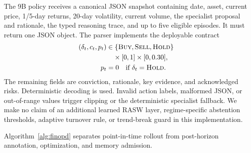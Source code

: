 The 9B policy receives a canonical JSON snapshot containing date, asset, current price, 1/5-day returns, 20-day volatility, current volume, the specialist proposal and rationale, the typed reasoning trace, and up to five eligible episodes. It must return one JSON object. The parser implements the deployable contract
\begin{equation}
\label{eq:selective_execution}
\begin{aligned}
(\delta_t,c_t,p_t)&\in
\{\textsc{Buy},\textsc{Sell},\textsc{Hold}\}\\
&\quad\times[0,1]\times[0,0.30],\\
p_t&=0\quad\text{if }\delta_t=\textsc{Hold}.
\end{aligned}
\end{equation}
The remaining fields are conviction, rationale, key evidence, and acknowledged risks. Deterministic decoding is used. Invalid action labels, malformed JSON, or out-of-range values trigger clipping or the deterministic specialist fallback. We make no claim of an additional learned RASW layer, regime-specific abstention thresholds, adaptive turnover rule, or trend-break guard in this implementation.

Algorithm~\ref{alg:finopd} separates point-in-time rollout from post-horizon annotation, optimization, and memory admission.


